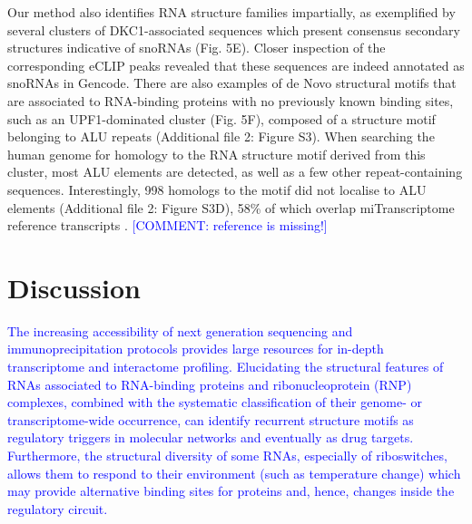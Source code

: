 \documentclass{bmcart}
\begin{document}
Our method also identifies RNA structure families impartially, 
as exemplified by several clusters of DKC1-associated sequences which present
consensus secondary structures indicative of snoRNAs (Fig. 5E). 
Closer inspection of the corresponding eCLIP peaks revealed that these sequences
are indeed annotated as snoRNAs in Gencode. There are also examples of de Novo 
structural motifs that are associated to RNA-binding proteins with no 
previously known binding sites, such as an UPF1-dominated cluster 
(Fig. 5F), composed of a structure motif belonging to ALU repeats 
(Additional file 2: Figure S3). When searching the human genome for 
homology to the RNA structure motif derived from this cluster, 
most ALU elements are detected, as well as a few other repeat-containing sequences. 
Interestingly, 998 homologs to the motif did not localise to ALU elements (Additional file 2: Figure S3D), 
58\% of which overlap miTranscriptome reference transcripts \cite{iyer2015landscape}. \textcolor{blue} {[COMMENT: reference is missing!]} 


\section*{Discussion}

\textcolor{blue} { 
The increasing accessibility of next generation sequencing and immunoprecipitation protocols provides large resources for in-depth transcriptome and interactome profiling. Elucidating the
structural features of RNAs associated to RNA-binding proteins and
ribonucleoprotein (RNP) complexes, combined with the systematic classification of
their genome- or transcriptome-wide occurrence, can identify recurrent structure motifs as regulatory triggers in molecular networks and eventually as drug targets.
Furthermore, the structural diversity of some RNAs,
especially of riboswitches, allows them to respond to their environment (such
as temperature change) which may provide alternative binding sites for
proteins and, hence, changes inside the regulatory circuit. \\
}
\end{document}
